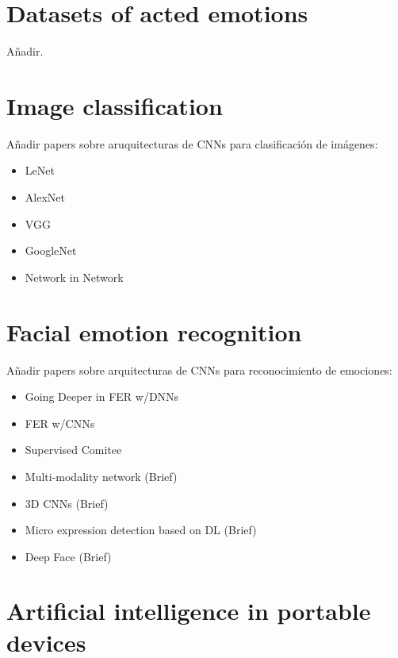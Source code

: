 
\section{Datasets of acted emotions}

{\color{JungleGreen} Añadir. }


\section{Image classification}

{\color{JungleGreen}
Añadir papers sobre aruquitecturas de CNNs para clasificación de imágenes:
\begin{itemize}
  \item LeNet
  \item AlexNet
  \item VGG
  \item GoogleNet
  \item Network in Network
\end{itemize}
}


\section{Facial emotion recognition}

{\color{JungleGreen}
Añadir papers sobre arquitecturas de CNNs para reconocimiento de emociones:
\begin{itemize}
  \item Going Deeper in FER w/DNNs
  \item FER w/CNNs
  \item Supervised Comitee
  \item Multi-modality network {\color{blue}(Brief)}
  \item 3D CNNs {\color{blue}(Brief)}
  \item Micro expression detection based on DL {\color{blue}(Brief)}
  \item Deep Face {\color{blue}(Brief)}
\end{itemize}
}


\section{Artificial intelligence in portable devices}


